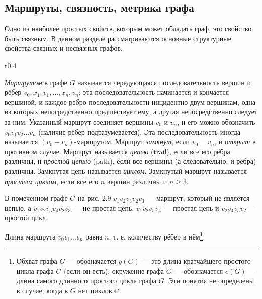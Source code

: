 \subsection{Маршруты, связность, метрика графа}

Одно из наиболее простых свойств, которым может обладать граф, это свойство быть связным. В данном разделе рассматриваются основные структурные свойства связных и несвязных графов.
\begin{wrapfigure}{r}{0.4\textwidth}
	\centering
\end{wrapfigure}
\textit{Маршрутом} в графе $G$ называется чередующаяся последовательность вершин и рёбер $v_0, x_1, v_1, \ldots, x_n, v_n$; эта последовательность начинается и кончается вершиной, и каждое ребро последовательности инцидентно двум вершинам, одна из которых непосредственно предшествует ему, а другая непосредственно следует за ним. Указанный маршрут соединяет вершины $v_0$ и $v_n$, и его можно обозначить $v_0 v_1 v_2 \ldots v_n$ (наличие рёбер подразумевается). Эта последовательность иногда называется $(v_0-v_n)$-маршрутом. Маршрут \textit{замкнут}, если $v_0 = v_n$, и \textit{открыт} в противном случае. Маршрут называется \textit{цепью} (trail), если все его рёбра различны, и \textit{простой цепью} (path), если все вершины (а следовательно, и рёбра) различны. Замкнутая цепь называется \textit{циклом}. Замкнутый маршрут называется \textit{простым циклом}, если все его $n$ вершин различны и $n \geq 3$.

В помеченном графе $G$ на рис. 2.9 $v_1 v_2 v_3 v_2 v_3$ — маршрут, который не является цепью, а $v_1 v_2 v_5 v_4 v_2 v_3$ — не простая цепь, $v_1 v_2 v_5 v_4$ — простая цепь и $v_2 v_4 v_5 v_2$ — простой цикл.

Длина маршрута $v_0 v_1 \ldots v_n$ равна $n$, т. е. количеству рёбер в нём\footnote{Обхват графа $G$ — обозначается $g(G)$ — это длина кратчайшего простого цикла графа $G$ (если он есть); окружение графа $G$ — обозначается $c(G)$ — длина самого длинного простого цикла графа $G$. Эти понятия не определены в случае, когда в $G$ нет циклов.}.
